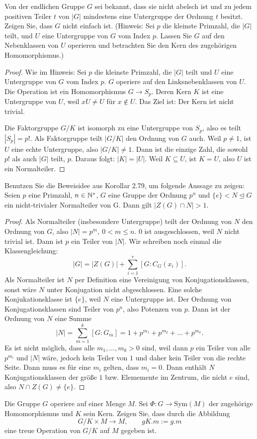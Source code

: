 \begin{Problem}
Von der endlichen Gruppe $G$ sei bekannt, dass sie nicht abelsch ist und zu jedem positiven Teiler $t$ von $|G|$ mindestens eine Untergruppe der Ordnung $t$ besitzt. Zeigen Sie, dass $G$ nicht einfach ist. (Hinweis: Sei $p$ die kleinste Primzahl, die $|G|$ teilt, und $U$ eine Untergruppe von $G$ vom Index $p$. Lassen Sie $G$ auf den Nebenklassen von $U$ operieren und betrachten Sie den Kern des zugehörigen Homomorphismus.)	
\end{Problem}
\begin{proof}
	Wie im Hinweis: Sei $p$ die kleinste Primzahl, die $|G|$ teilt und $U$ eine Untergruppe von $G$ vom Index $p$. $G$ operiere auf den Linksnebenklassen von $U$. Die Operation ist ein Homomorphismus $G\to S_p$. Deren Kern $K$ ist eine Untergruppe von $U$, weil $xU\neq U$ f\"{u}r $x\not\in  U$. Das Ziel ist: Der Kern ist nicht trivial.

Die Faktorgruppe $G / K$ ist isomorph zu eine Untergruppe von $S_p$, also es teilt $|S_p|=p!$. Als Faktorgruppe teilt $|G / K|$ den Ordnung von $G$ auch. Weil $p\neq 1$, ist $U$ eine echte Untergruppe, also $|G / K| \neq 1$. Dann ist die einzige Zahl, die sowohl $p!$ als auch $|G|$ teilt, $p$. Daraus folgt: $|K|=|U|$. Weil $K\subseteq U$, ist $K=U$, also $U$ ist ein Normalteiler.
\end{proof}
\begin{Problem}
Benutzen Sie die Beweisidee aus Korollar 2.79, um folgende Aussage zu zeigen: Seien $p$ eine Primzahl, $n \in \mathbb{N}^*$, $G$ eine Gruppe der Ordnung $p^n$ und $\{e\} < N \trianglelefteq G$ ein nicht-trivialer Normalteiler von G. Dann gilt $|Z(G) \cap N| > 1$.	
\end{Problem}
\begin{proof}
	Als Normalteiler (insbesondere Untergruppe) teilt der Ordnung von $N$ den Ordnung von $G$, also $|N|=p^m,~0<m\le n$. $0$ ist ausgeschlossen, weil $N$ nicht trivial ist. Dann ist $p$ ein Teiler von $|N|$. Wir schreiben noch einmal die Klassengleichung:
	\[
	|G|=|Z(G)|+\sum_{i=1}^r [G:C_G(x_i)]
	.\] 
	Als Normalteiler ist $N$ per Definition eine Vereinigung von Konjugationsklassen, sonst wäre $N$ unter Konjugation nicht abgeschlossen. Eine solche Konjukationsklasse ist $\{e\} $, weil $N$ eine Untergruppe ist. Der Ordnung von Konjugationsklassen sind Teiler von $p^n$, also Potenzen von $p$. Dann ist der Ordnung von $N$ eine Summe
	\[
		|N|=\sum_{m=1}^k [G:G_m]=1+p^{m_1}+p^{m_2}+\dots+p^{m_k}
	.\] 
	Es ist nicht möglich, dass alle $m_1,\dots, m_k>0$ sind, weil dann $p$ ein Teiler von alle $p^{m_i}$ und $|N|$ wäre, jedoch kein Teiler von $1$ und daher kein Teiler von die rechte Seite. Dann muss es f\"{u}r eine $m_i$ gelten, dass $m_i=0$. Dann enthält $N$ Konjugationsklassen der größe $1$ bzw. Elememente im Zentrum, die nicht $e$ sind, also $N\cap Z(G)\neq \{e\} $.
\end{proof}
\begin{Problem}
	Die Gruppe $G$ operiere auf einer Menge $M$. Sei $\Phi:G\to \text{Sym}(M)$ der zugehörige Homomorphismus und $K$ sein Kern. Zeigen Sie, dass durch die Abbildung
	\[
G / K \times M \to M,\qquad gK.m:=g.m
\]
eine treue Operation von $G / K$ auf $M$ gegeben ist.
\end{Problem}

